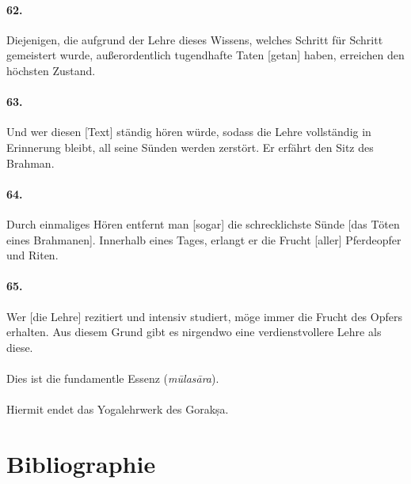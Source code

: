 \documentclass[a4paper,12pt]{article}
\begin{document}
\paragraph{62.} Diejenigen, die aufgrund der Lehre dieses Wissens, welches Schritt für Schritt gemeistert wurde, außerordentlich tugendhafte Taten [getan] haben, erreichen den höchsten Zustand.
\label{verdienst}

\paragraph{63.} Und wer diesen [Text] ständig hören würde, sodass die Lehre vollständig in Erinnerung bleibt, all seine Sünden werden zerstört. Er erfährt den Sitz des Brahman.

\paragraph{64.} Durch einmaliges Hören entfernt man [sogar] die schrecklichste Sünde [das Töten eines Brahmanen]. Innerhalb eines Tages, erlangt er die Frucht [aller] Pferdeopfer und Riten. 

\paragraph{65.} Wer [die Lehre] rezitiert und intensiv studiert, möge immer die Frucht des Opfers erhalten. Aus diesem Grund gibt es nirgendwo eine verdienstvollere Lehre als diese.
\\
\\
\noindent Dies ist die fundamentle Essenz (\textit{mūlasāra}).
\\
\\
\noindent Hiermit endet das Yogalehrwerk des Gorakṣa. 
 
\clearpage

 \section{Bibliographie}
 \label{sec:bibli}
 

\printshorthands[keyword=critEd]

\printbibliography[title=Konsultierte Manuskripte, keyword=codex]

\printbibliography[title=Druckausgaben und e-Texts, keyword=printsource]

\printbibliography[title=Sekundärliteratur, keyword=seclit]

\end{document}

